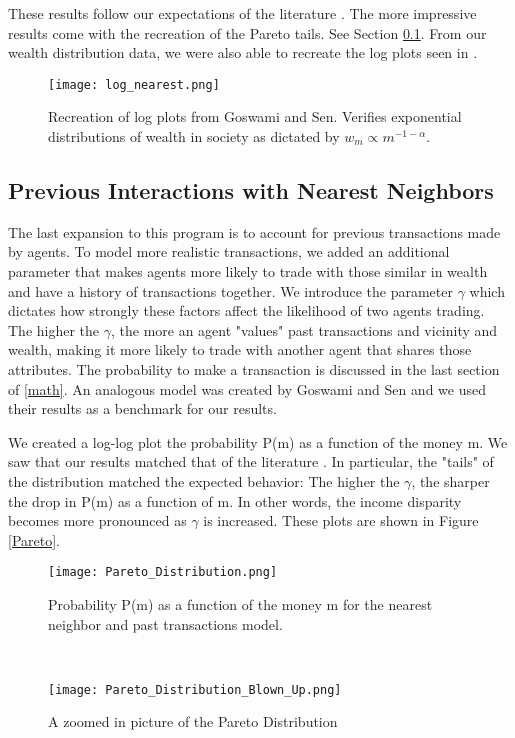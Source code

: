 \documentclass[11pt]{article}
\begin{document}
These results follow our expectations of the literature \cite{goswami}. The more impressive results come with the recreation of the Pareto tails. See Section \ref{previous}. From our wealth distribution data, we were also able to recreate the log plots seen in \cite{goswami}.

\begin{figure}
	\centering
	\texttt{[image: log\_nearest.png]}
	\caption{Recreation of log plots from Goswami and Sen. Verifies exponential distributions of wealth in society as dictated by $w_m \propto m^{-1-\alpha}$.}
	\label{logs}
\end{figure}

\subsection{Previous Interactions with Nearest Neighbors} \label{previous}
The last expansion to this program is to account for previous transactions made by agents. To model more realistic transactions, we added an additional parameter that makes agents more likely to trade with those similar in wealth and have a history of transactions together. We introduce the parameter $\gamma$ which dictates how strongly these factors affect the likelihood of two agents trading. The higher the $\gamma$, the more an agent "values" past transactions and vicinity and wealth, making it more likely to trade with another agent that shares those attributes. The probability to make a transaction is discussed in the last section of \ref{math}. An analogous model was created by Goswami and Sen \cite{goswami} and we used their results as a benchmark for our results. 

We created a log-log plot the probability P(m) as a function of the money m. We saw that our results matched that of the literature \cite{goswami}. In particular, the "tails" of the distribution matched the expected behavior: The higher the $\gamma$, the sharper the drop in P(m) as a function of m. In other words, the income disparity becomes more pronounced as $\gamma$ is increased. These plots are shown in Figure \ref{Pareto}.

\begin{figure*}[!ht]
	\begin{subfigure}{0.5\textwidth}
		\texttt{[image: Pareto\_Distribution.png]}
		\caption{Probability P(m) as a function of the money m for the nearest neighbor and past transactions model.}
	\end{subfigure}
	~
	\begin{subfigure}{0.5\textwidth}
		\texttt{[image: Pareto\_Distribution\_Blown\_Up.png]}
		\caption{A zoomed in picture of the Pareto Distribution}
	\end{subfigure}
	\caption{The Pareto Distributions of our nearest neighbor and past transactions model. These behaviors match that of Goswami and Sen\cite{goswami}.}
	\label{Pareto}
\end{figure*}
\end{document}
